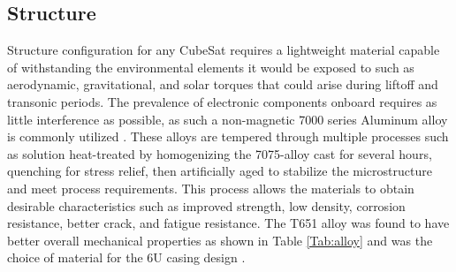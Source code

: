 \subsection{Structure}
Structure configuration for any CubeSat requires a lightweight material capable of withstanding the environmental elements it would be exposed to such as aerodynamic, gravitational, and solar torques that could arise during liftoff and transonic periods. The prevalence of electronic components onboard requires as little interference as possible, as such a non-magnetic 7000 series Aluminum alloy is commonly utilized \cite{TheWorldMaterial2021}. These alloys are tempered through multiple processes such as solution heat-treated by homogenizing the 7075-alloy cast for several hours, quenching for stress relief, then artificially aged to stabilize the microstructure and meet process requirements. This process allows the materials to obtain desirable characteristics such as improved strength, low density, corrosion resistance, better crack, and fatigue resistance. The T651 alloy was found to have better overall mechanical properties as shown in Table \ref{Tab:alloy} and was the choice of material for the 6U casing design .

